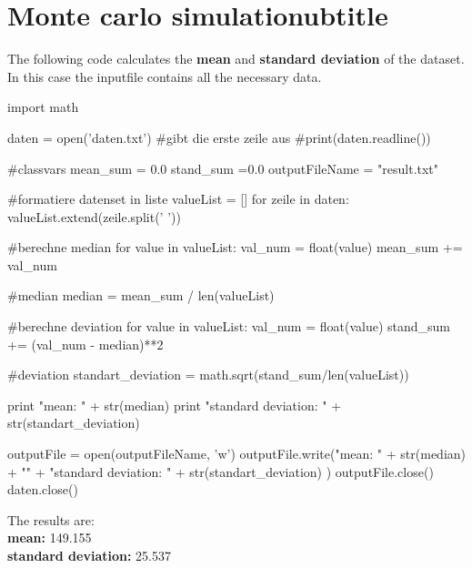 \section{Monte carlo simulationubtitle}
The following code calculates the \textbf{mean}  and \textbf{standard deviation} of the dataset. 
In this case the inputfile contains all the necessary data.

\begin{python}[caption={Python code for median and standard deviation}]
import math

daten = open('daten.txt')
#gibt die erste zeile aus
#print(daten.readline()) 

#classvars
mean_sum = 0.0 
stand_sum =0.0
outputFileName = "result.txt"

#formatiere datenset in liste
valueList = []
for zeile in daten:
    valueList.extend(zeile.split(' '))

#berechne median
for value in  valueList:
    val_num = float(value)   
    mean_sum += val_num
    
#median
median = mean_sum / len(valueList)

#berechne deviation
for value in  valueList:
    val_num = float(value)
    stand_sum += (val_num - median)**2
    
#deviation
standart_deviation = math.sqrt(stand_sum/len(valueList))
    
print "mean:               " + str(median)
print "standard deviation: " + str(standart_deviation)

outputFile = open(outputFileName, 'w')
outputFile.write("mean:               " + str(median) + "\n" + "standard deviation: " + str(standart_deviation) )
outputFile.close()
daten.close()
\end{python}
The results are:\\
\textbf{mean:				}   149.155 \\        
\textbf {standard deviation:} 	25.537